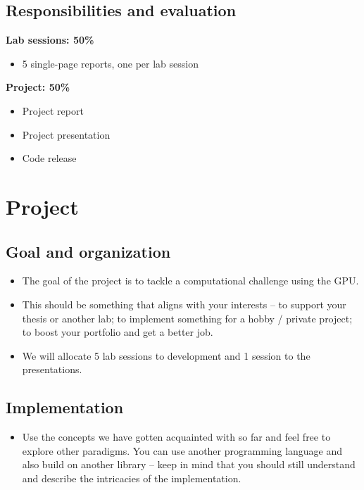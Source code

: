 \subsection{Responsibilities and evaluation}

\begin{minipage}[t]{0.48\linewidth}
\textbf{Lab sessions: 50\%}
\begin{itemize}[nosep]
  \item 5 single-page reports, one per lab session
\end{itemize}
\end{minipage}\hfill
\begin{minipage}[t]{0.48\linewidth}
\textbf{Project: 50\%}
\begin{itemize}[nosep]
  \item Project report
  \item Project presentation
  \item Code release
\end{itemize}
\end{minipage}

\section{Project}

\subsection{Goal and organization}
\begin{itemize}
  \item The goal of the project is to tackle a computational challenge using the GPU.
  \item This should be something that aligns with your interests -- to support your thesis or another lab; to implement something for a hobby / private project; to boost your portfolio and get a better job.
  \item We will allocate 5 lab sessions to development and 1 session to the presentations.
\end{itemize}

\subsection{Implementation}
\begin{itemize}
  \item Use the concepts we have gotten acquainted with so far and feel free to explore other paradigms. You can use another programming language and also build on another library -- keep in mind that you should still understand and describe the intricacies of the implementation.
\end{itemize}


